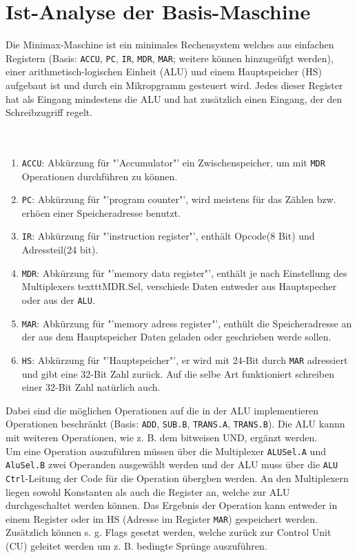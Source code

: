 \documentclass[12pt,titlepage]{article}
\begin{document}
\section{Ist-Analyse der Basis-Maschine}

Die Minimax-Maschine ist ein minimales Rechensystem welches aus einfachen Registern (Basis: \texttt{ACCU}, \texttt{PC}, \texttt{IR}, \texttt{MDR}, \texttt{MAR};
weitere k{\"o}nnen hinzuge{\"u}fgt werden), einer arithmetisch-logischen Einheit (ALU) und einem Hauptspeicher (HS) aufgebaut
ist und durch ein Mikropgramm gesteuert wird. Jedes dieser Register hat als Eingang mindestens die ALU und hat zusätzlich einen Eingang, der den Schreibzugriff regelt.\\
\\
\\
\begin{enumerate}
\item \texttt{ACCU}: Abk{\"u}rzung f{\"u}r "'Accumulator"' ein Zwischenspeicher, um mit \texttt{MDR} Operationen durchführen zu k{\"o}nnen.
\item \texttt{PC}: Abk{\"u}rzung f{\"u}r "'program counter"', wird meistens f{\"u}r das Z{\"a}hlen bzw. erh{\"o}en einer Speicheradresse benutzt.
\item \texttt{IR}: Abk{\"u}rzung f{\"u}r "'instruction register"', enthält Opcode(8 Bit) und Adressteil(24 bit).
\item \texttt{MDR}: Abk{\"u}rzung f{\"u}r "'memory data register"', enthält je nach Einstellung des Multiplexers texttt{MDR.Sel}, verschiede Daten entweder aus Hauptspecher oder aus der \texttt{ALU}.
\item \texttt{MAR}: Abk{\"u}rzung f{\"u}r "'memory adress register"', enth{\"u}lt die Speicheradresse an der aus dem Hauptspeicher Daten geladen oder geschrieben werde sollen.
\item \texttt{HS}: Abk{\"u}rzung f{\"u}r "'Hauptspeicher"', er wird mit 24-Bit durch \texttt{MAR} adressiert und gibt eine 32-Bit Zahl zur{\"u}ck. Auf die selbe Art funktioniert schreiben einer 32-Bit Zahl nat{\"u}rlich auch.
\end{enumerate}
Dabei sind die m{\"o}glichen Operationen auf die in der ALU implementieren
Operationen beschr{\"a}nkt (Basis: \texttt{ADD}, \texttt{SUB.B}, \texttt{TRANS.A}, \texttt{TRANS.B}). Die ALU kannn mit weiteren Operationen,
wie z. B. dem bitweisen UND, erg{\"a}nzt werden.\\
Um eine Operation auszuf{\"u}hren m{\"u}ssen {\"u}ber die Multiplexer \texttt{ALUSel.A} und \texttt{AluSel.B} zwei Operanden ausgew{\"a}hlt werden
und der ALU muss {\"u}ber die \texttt{ALU Ctrl}-Leitung der Code f{\"u}r die Operation {\"u}bergben werden. An den Multiplexern liegen sowohl
Konstanten als auch die Register an, welche zur ALU durchgeschaltet werden k{\"o}nnen. Das Ergebnis der Operation kann
entweder in einem Register oder im HS (Adresse im Register \texttt{MAR}) gespeichert werden. Zus{\"a}tzlich k{\"o}nnen s. g. Flags 
gesetzt werden, welche zur{\"u}ck zur Control Unit (CU) geleitet werden um z. B. bedingte Spr{\"u}nge auszuf{\"u}hren.
\end{document}
